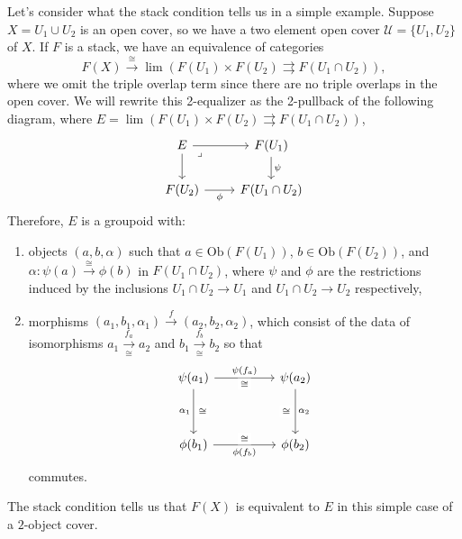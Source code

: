 \begin{example}
Let's consider what the stack condition tells us in a simple example. Suppose \( X = U_1 \cup U_2 \) is an open cover, so we have a two element open cover $\mathcal{U} = \{ U_1, U_2 \}$ of $X$. If $F$ is a stack, we have an equivalence of categories
    \[ F(X) \xrightarrow{\cong} \lim \left(F(U_1) \times F(U_2) \rightrightarrows F(U_1 \cap U_2) \right), \]
    where we omit the triple overlap term since there are no triple overlaps in the open cover. We will rewrite this 2-equalizer as the 2-pullback of the following diagram, where \( E = \lim \left(F(U_1) \times F(U_2) \rightrightarrows F(U_1 \cap U_2) \right) \),
    \[\begin{tikzcd}
    	E & {F(U_1)} \\
    	{F(U_2)} & {F(U_1 \cap U_2)}
    	\arrow[from=1-1, to=1-2]
    	\arrow[from=1-1, to=2-1]
    	\arrow["\lrcorner"{anchor=center, pos=0.125}, draw=none, from=1-1, to=2-2]
    	\arrow["\psi", from=1-2, to=2-2]
    	\arrow["\phi"', from=2-1, to=2-2]
    \end{tikzcd} \]
    Therefore, \( E \) is a groupoid with:
    \begin{enumerate}
        \item objects $(a,b,\alpha)$ such that \( a \in \text{Ob}(F(U_1)) \), \( b \in \text{Ob}(F(U_2))\), and \( \alpha: \psi(a) \xrightarrow{\cong} \phi(b) \) in $F(U_1 \cap U_2)$, where $\psi$ and $\phi$ are the restrictions induced by the inclusions $U_1 \cap U_2 \to U_1$ and $U_1 \cap U_2 \to U_2$ respectively,
        \item morphisms $(a_1,b_1,\alpha_1) \xrightarrow{f} (a_2,b_2,\alpha_2)$, which consist of the data of isomorphisms $a_1 \xrightarrow[\cong]{f_a} a_2$ and $b_1 \xrightarrow[\cong]{f_b} b_2$
        so that
        \[\begin{tikzcd}
        	{\psi(a_1)} && {\psi(a_2)} \\
        	\\
        	{\phi(b_1)} && {\phi(b_2)}
        	\arrow["{{\psi(f_a)}}", from=1-1, to=1-3]
        	\arrow["\cong"{description}, shift right=2, draw=none, from=1-1, to=1-3]
        	\arrow["{{\alpha_1}}"', from=1-1, to=3-1]
        	\arrow["\cong"{description}, shift left=3, draw=none, from=1-1, to=3-1]
        	\arrow["{{\alpha_2}}", from=1-3, to=3-3]
        	\arrow["\cong"{description}, shift right=3, draw=none, from=1-3, to=3-3]
        	\arrow["{{\phi(f_b)}}"', from=3-1, to=3-3]
        	\arrow["\cong"{description}, shift left=2, draw=none, from=3-1, to=3-3]
        \end{tikzcd}\]
        commutes.
    \end{enumerate}
    The stack condition tells us that \( F(X) \) is equivalent to \( E \) in this simple case of a $2$-object cover. 
\end{example}
